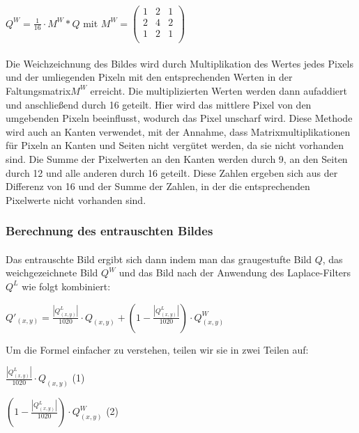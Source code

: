 \documentclass[course=erap]{aspdoc}
\begin{document}
\begin{center}
    \(Q^W = \frac{1}{16} \cdot M^W * Q\) 
        mit 
    \(M^W = \begin{pmatrix} 
                1 & 2 & 1 \\
                2 & 4 & 2 \\
                1 & 2 & 1 \\
            \end{pmatrix}\)
\end{center}

\paragraph{}
Die Weichzeichnung des Bildes wird durch Multiplikation des Wertes jedes Pixels und der umliegenden Pixeln mit den entsprechenden 
Werten in der Faltungsmatrix\(M^W\) erreicht. Die multiplizierten Werten werden dann aufaddiert und anschließend durch 16 geteilt.
Hier wird das mittlere Pixel von den umgebenden Pixeln beeinflusst, wodurch das Pixel unscharf wird. Diese Methode wird auch an 
Kanten verwendet, mit der Annahme, dass Matrixmultiplikationen für Pixeln an Kanten und Seiten nicht vergütet werden, da sie nicht 
vorhanden sind. Die Summe der Pixelwerten an den Kanten werden durch 9, an den Seiten durch 12 und alle anderen durch 16 geteilt. 
Diese Zahlen ergeben sich aus der Differenz von 16 und der Summe der Zahlen, in der die entsprechenden Pixelwerte nicht vorhanden
sind.

\subsubsection*{Berechnung des entrauschten  Bildes}

\paragraph{}
Das entrauschte Bild ergibt sich dann indem man das graugestufte Bild \(Q\), das weichgezeichnete Bild \(Q^W\) und das Bild nach der Anwendung des Laplace-Filters \(Q^L\) wie folgt kombiniert:

\begin{center}
    \(Q'_{(x, y)} = \frac{|Q_{(x, y)}^L|}{1020} \cdot Q_{(x, y)} + (1 - \frac{|Q_{(x, y)}^L|}{1020}) \cdot Q_{(x, y)}^W\)
\end{center}

Um die Formel einfacher zu verstehen, teilen wir sie in zwei Teilen auf: 

\begin{center}
    \(\frac{|Q_{(x, y)}^L|}{1020} \cdot Q_{(x, y)}\) (1)
\end{center}
\begin{center}
     \((1 - \frac{|Q_{(x, y)}^L|}{1020}) \cdot Q_{(x, y)}^W\) (2)
\end{center}
\end{document}
